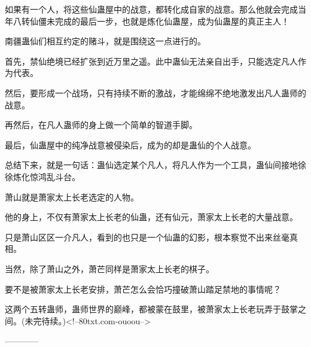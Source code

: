 \begin{this_body}
如果有一个人，将这些仙蛊屋中的战意，都转化成自家的战意。那么他就会完成当年八转仙僵未完成的最后一步，也就是炼化仙蛊屋，成为仙蛊屋的真正主人！

南疆蛊仙们相互约定的赌斗，就是围绕这一点进行的。

首先，禁仙绝境已经扩张到近万里之遥。此中蛊仙无法亲自出手，只能选定凡人作为代表。

然后，要形成一个战场，只有持续不断的激战，才能绵绵不绝地激发出凡人蛊师的战意。

再然后，在凡人蛊师的身上做一个简单的智道手脚。

最后，仙蛊屋中的纯净战意被侵染后，成为的却是蛊仙的个人战意。

总结下来，就是一句话：蛊仙选定某个凡人，将凡人作为一个工具，蛊仙间接地徐徐炼化惊鸿乱斗台。

萧山就是萧家太上长老选定的人物。

他的身上，不仅有萧家太上长老的仙蛊，还有仙元，萧家太上长老的大量战意。

只是萧山区区一介凡人，看到的也只是一个仙蛊的幻影，根本察觉不出来丝毫真相。

当然，除了萧山之外，萧芒同样是萧家太上长老的棋子。

要不是被萧家太上长老安排，萧芒怎么会恰巧撞破萧山踏足禁地的事情呢？

这两个五转蛊师，蛊师世界的巅峰，都被蒙在鼓里，被萧家太上长老玩弄于鼓掌之间。(未完待续。)<!--80txt.com-ouoou-->

------------

\end{this_body}

